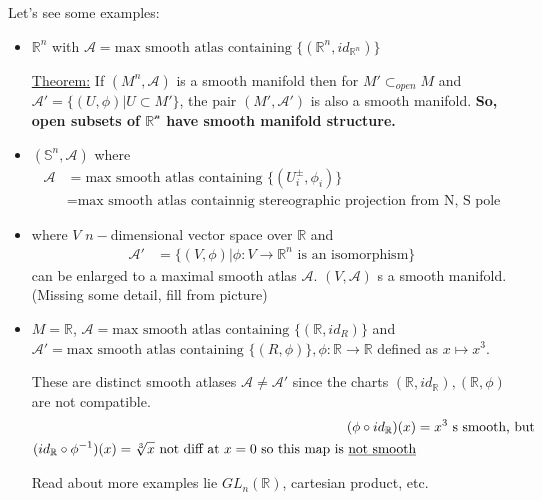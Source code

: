 \documentclass{article}
\newcommand{\R}{\mathbb{R}}
\begin{document}
\vskip 0.5cm
Let's see some examples:
\begin{dottedbox}
  \begin{itemize}
    \item $\R^n$ with $\mathcal{A} = \text{max smooth atlas containing }\{(\R^n, id_{\R^n})\}$
    
    \vskip 0.5cm  
    \underline{Theorem:} If $(M^n, \mathcal{A})$ is a smooth manifold then for $M' \subset_{open} M$ and $\mathcal{A}' = \{ (U, \phi) | U \subset M' \}$, the pair $(M', \mathcal{A}')$ is also a smooth manifold.
    \textbf{So, open subsets of $\mathcal{\R^n}$ have smooth manifold structure.}

    \vskip 0.5cm  
    \item $(\mathbb{S}^n, \mathcal{A})$ where
    \begin{align*}
      \mathcal{A} &= \text{max smooth atlas containing } \{(U_i^{\pm}, \phi_i)\} \\
      &= \text{max smooth atlas containnig stereographic projection from N, S pole}
    \end{align*}
    
    \vskip 0.5cm  
    \item  where $V$ $n-$dimensional vector space over $\R$ and 
    \begin{align*}
      \mathcal{A}' &= \{ (V, \phi) | \phi : V \rightarrow \R^n \text{ is an isomorphism}\}
    \end{align*}
    can be enlarged to a maximal smooth atlas $\mathcal{A}$. $(V, \mathcal{A})$ s a smooth manifold. (Missing some detail, fill from picture)

  \vskip 0.5cm  
  \item $M = \mathbb{R}$, $\mathcal{A} = \text{max smooth atlas containing } \{(\R, id_{R})\}$ and $\mathcal{A}' = \text{max smooth atlas containing } \{(R, \phi)\}, \phi : \R \rightarrow \R$ defined as $x \mapsto x^3$.
  
  \vskip 0.5cm  
  These are distinct smooth atlases $\mathcal{A} \neq \mathcal{A}'$ since the charts $(\R, id_{\R}), (\R, \phi)$ are not compatible.
  \begin{align*}
    (\phi \circ id_{\R})(x) &= x^3 \text{ s smooth, but} \\
    (id_{\R} \circ \phi^{-1})(x) = \sqrt[3]{x} \text{  not diff at $x = 0$ so this map is \underline{not smooth}} 
  \end{align*}
  
  \vskip 0.5cm  
  Read about more examples lie $GL_n(\R)$, cartesian product, etc.
  \end{itemize}
\end{dottedbox}
\end{document}
